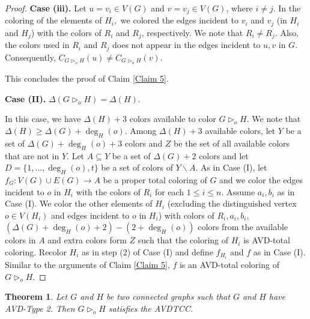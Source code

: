 \documentclass[12pt]{article}
\theoremstyle{definition}
\newtheorem{thm}[defn]{Theorem}
\begin{document}
\begin{proof}
\textbf{Case (iii).} Let $u=v_i \in V(G)$ and $v=v_j \in V(G)$, where $i\neq j$.
In the coloring of the elements of $H_i,$ we colored the edges incident to $v_i$ and $v_j$ (in $H_i$ and $H_j$) with the colors of $R_i$ and $R_j$, respectively.
We note that $R_i\neq R_j$.
Also, the colors used in $R_i$ and $R_j$ does not appear in the edges incident to $u,v$ in $G$. 
Consequently, $C_{G \triangleright_o H}(u)\neq C_{G \triangleright_o H}(v)$.

This concludes the proof of Claim \ref{Claim 5}.


\textbf{Case (II).} 
$\Delta(G \triangleright_o H)=\Delta(H).$

In this case, we have $\Delta(H)+3$ colors available to color $G \triangleright_o H$. We note that $\Delta(H)\geq \Delta(G)+\deg_H(o)$.
Among $\Delta(H)+3$ available colors, let $Y$ be a set of $\Delta(G)+\deg_H(o)+3$ colors and $Z$ be the set of all available colors that are not in $Y$.
Let $A\subseteq Y$ be a set of $\Delta(G)+2$ colors and let $D=\{1,...,\deg_{H}(o), t\}$ be a set of colors of $Y\backslash A$.
As in Case (I), let $f_{G}:V(G)\cup E(G)\rightarrow A$ be a proper total coloring of $G$ and we color the edges incident to $o$ in $H_i$ with the colors of $R_i$ for each $1\leq i\leq n$. 
Assume $a_i, b_i$ as in Case (I).
We color the other elements of $H_i$ (excluding the distinguished vertex $o\in V(H_i)$ and edges incident to $o$ in $H_i$) with colors of $R_i,a_i,b_i$,   $(\Delta(G)+\deg_H(o)+2)-(2+\deg_H(o))$ colors from the available colors in $A$ and extra colors form $Z$ such that the coloring of $H_i$ is AVD-total coloring. 
Recolor $H_i$ as in step (2) of Case (I) and define $f_{H_i}$ and $f$ as in Case (I). Similar to the arguments of Claim \ref{Claim 5}, $f$ is an AVD-total coloring of $G \triangleright_o H$.
\end{proof}



\begin{thm}\label{Theorem 6.2}
{\em Let $G$ and $H$ be two connected graphs such that $G$ and $H$ have AVD-Type 2. Then $G\triangleright_o H$ satisfies the AVDTCC.}
\end{thm}
\end{document}
